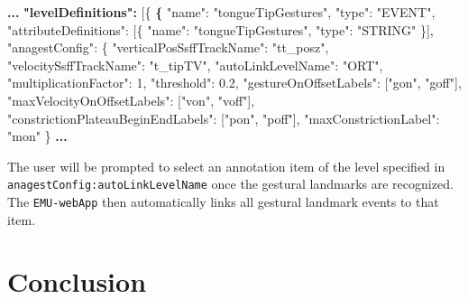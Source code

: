 \documentclass[]{book}
\newenvironment{Shaded}{\begin{snugshade}}{\end{snugshade}}
\newcommand{\DataTypeTok}[1]{\textcolor[rgb]{0.13,0.29,0.53}{#1}}
\newcommand{\DecValTok}[1]{\textcolor[rgb]{0.00,0.00,0.81}{#1}}
\newcommand{\ErrorTok}[1]{\textcolor[rgb]{0.64,0.00,0.00}{\textbf{#1}}}
\newcommand{\FloatTok}[1]{\textcolor[rgb]{0.00,0.00,0.81}{#1}}
\newcommand{\FunctionTok}[1]{\textcolor[rgb]{0.00,0.00,0.00}{#1}}
\newcommand{\OtherTok}[1]{\textcolor[rgb]{0.56,0.35,0.01}{#1}}
\newcommand{\StringTok}[1]{\textcolor[rgb]{0.31,0.60,0.02}{#1}}
\theoremstyle{definition}
\theoremstyle{definition}
\theoremstyle{definition}
\theoremstyle{remark}
\begin{document}
\begin{Shaded}
\begin{Highlighting}[]
\ErrorTok{...}
\ErrorTok{"levelDefinitions":} \OtherTok{[}\FunctionTok{\{}
  \ErrorTok{\{}
    \DataTypeTok{"name"}\FunctionTok{:} \StringTok{"tongueTipGestures"}\FunctionTok{,}
    \DataTypeTok{"type"}\FunctionTok{:} \StringTok{"EVENT"}\FunctionTok{,}
    \DataTypeTok{"attributeDefinitions"}\FunctionTok{:} \OtherTok{[}\FunctionTok{\{}
        \DataTypeTok{"name"}\FunctionTok{:} \StringTok{"tongueTipGestures"}\FunctionTok{,}
        \DataTypeTok{"type"}\FunctionTok{:} \StringTok{"STRING"}
    \FunctionTok{\}}\OtherTok{]}\FunctionTok{,}
    \DataTypeTok{"anagestConfig"}\FunctionTok{:} \FunctionTok{\{}
        \DataTypeTok{"verticalPosSsffTrackName"}\FunctionTok{:} \StringTok{"tt_posz"}\FunctionTok{,}
        \DataTypeTok{"velocitySsffTrackName"}\FunctionTok{:} \StringTok{"t_tipTV"}\FunctionTok{,}
        \DataTypeTok{"autoLinkLevelName"}\FunctionTok{:} \StringTok{"ORT"}\FunctionTok{,}
        \DataTypeTok{"multiplicationFactor"}\FunctionTok{:} \DecValTok{1}\FunctionTok{,}
        \DataTypeTok{"threshold"}\FunctionTok{:} \FloatTok{0.2}\FunctionTok{,}
        \DataTypeTok{"gestureOnOffsetLabels"}\FunctionTok{:} \OtherTok{[}\StringTok{"gon"}\OtherTok{,} \StringTok{"goff"}\OtherTok{]}\FunctionTok{,}
        \DataTypeTok{"maxVelocityOnOffsetLabels"}\FunctionTok{:} \OtherTok{[}\StringTok{"von"}\OtherTok{,} \StringTok{"voff"}\OtherTok{]}\FunctionTok{,}
        \DataTypeTok{"constrictionPlateauBeginEndLabels"}\FunctionTok{:} \OtherTok{[}\StringTok{"pon"}\OtherTok{,} \StringTok{"poff"}\OtherTok{]}\FunctionTok{,}
        \DataTypeTok{"maxConstrictionLabel"}\FunctionTok{:} \StringTok{"mon"}
    \FunctionTok{\}}
\ErrorTok{...}
\end{Highlighting}
\end{Shaded}

The user will be prompted to select an annotation item of the level
specified in \texttt{anagestConfig:autoLinkLevelName} once the gestural
landmarks are recognized. The \texttt{EMU-webApp} then automatically
links all gestural landmark events to that item.

\hypertarget{conclusion-5}{%
\section{Conclusion}\label{conclusion-5}}
\end{document}
